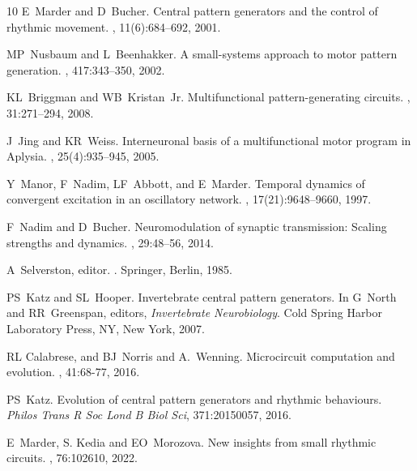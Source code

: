 \documentclass[nofootinbib,aip,amsmath,amssymb,preprint,twocolumn,floatfix,10pt]{revtex4-2}
\begin{document}
\begin{thebibliography}{10}
E~Marder and D~Bucher.
\newblock Central pattern generators and the control of rhythmic movement.
, 11(6):684--692, 2001.

MP~Nusbaum and L~Beenhakker.
\newblock A small-systems approach to motor pattern generation.
, 417:343--350, 2002.

KL~Briggman and WB~Kristan~Jr.
\newblock Multifunctional pattern-generating circuits.
, 31:271--294, 2008.

J~Jing and KR~Weiss.
\newblock Interneuronal basis of a multifunctional motor program in Aplysia.
, 25(4):935--945, 2005.

Y~Manor, F~Nadim, LF~Abbott, and E~Marder.
\newblock Temporal dynamics of convergent excitation in an oscillatory network.
, 17(21):9648--9660, 1997.

F~Nadim and D~Bucher.
\newblock Neuromodulation of synaptic transmission: Scaling strengths and dynamics.
, 29:48--56, 2014.

A~Selverston, editor.
.
\newblock Springer, Berlin, 1985.


PS~Katz and SL~Hooper.
\newblock Invertebrate central pattern generators.
\newblock In G~North and RR~Greenspan, editors, {\em Invertebrate
  Neurobiology}. Cold Spring Harbor Laboratory Press, NY, New York, 2007.
  
 RL Calabrese, and BJ~Norris and A.~Wenning.
\newblock Microcircuit computation and evolution.
,
  41:68-77, 2016. 
  
PS~Katz.
\newblock Evolution of central pattern generators and rhythmic behaviours.
 {\em Philos Trans R Soc Lond B Biol Sci}, 371:20150057, 2016. 
  

 E~Marder, S. Kedia and EO~Morozova.
\newblock New insights from small rhythmic circuits.
,
  76:102610, 2022.





\end{thebibliography}
\end{document}
